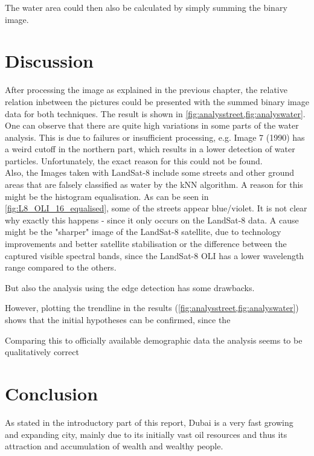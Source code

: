 The water area could then also be calculated by simply summing the binary image.

\section{Discussion}
After processing the image as explained in the previous chapter, the relative relation inbetween the pictures could be presented with the summed binary image data for both techniques. The result is shown in \cref{fig:analysstreet,fig:analyswater}. \\
One can observe that there are quite high variations in some parts of the water analysis. This is due to failures or insufficient processing, e.g. Image 7 (1990) has a weird cutoff in the northern part, which results in a lower detection of water particles. Unfortunately, the exact reason for this could not be found.\\
Also, the Images taken with LandSat-8 include some streets and other ground areas that are falsely classified as water by the kNN algorithm. A reason for this might be the histogram equalisation. As can be seen in \cref{fig:L8_OLI_16_equalised}, some of the streets appear blue/violet. It is not clear why exactly this happens - since it only occurs on the LandSat-8 data. A cause might be the "sharper" image of the LandSat-8 satellite, due to technology improvements and better satellite stabilisation or the difference between the captured visible spectral bands, since the LandSat-8 OLI has a lower wavelength range compared to the others.

But also the analysis using the edge detection has some drawbacks.


However, plotting the trendline in the results (\cref{fig:analysstreet,fig:analyswater}) shows that the initial hypotheses can be confirmed, since the



Comparing this to officially available demographic data the analysis seems to be qualitatively correct

\begin{figure}[h!]
\centering
\begin{minipage}{.5\textwidth}
	\centering
	\label{fig:analysstreet}
\end{minipage}%
\begin{minipage}{.5\textwidth}
	\centering
	\label{fig:analyswater}
\end{minipage}
\end{figure}



\section{Conclusion}

As stated in the introductory part of this report, Dubai is a very fast growing and expanding city, mainly due to its initially vast oil resources and thus its attraction and accumulation of wealth and wealthy people.



